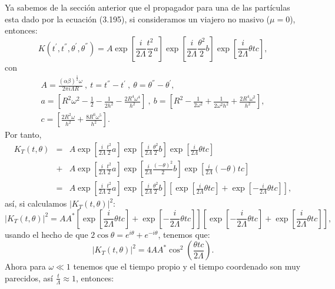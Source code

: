 Ya sabemos de la sección anterior que el propagador para una de las partículas esta dado por la ecuación (3.195), si consideramos un viajero no masivo ($\mu=0$), entonces:
\begin{equation}
K(t^{'},t^{''},\theta^{'},\theta^{''})=A\exp\left[\frac{i}{2\Lambda}\frac{t^{2}}{2}a\right]\exp\left[\frac{i}{2\Lambda}\frac{\theta^{2}}{2}b\right]\exp\left[\frac{i}{2\Lambda}\theta tc\right],
\end{equation}
con
\begin{eqnarray}
\nonumber &A=\frac{(\alpha\beta)^{\frac{1}{2}}\omega}{2\pi i\Lambda R}\ ,\ t=t^{''}-t^{'}\ ,\ \theta=\theta^{''}-\theta^{'},&\\
\nonumber & a=\left[R^{2}\omega^{2}-\frac{1}{2}-\frac{1}{2h^{2}}-\frac{2R^{4}\omega^{4}}{h^{2}}\right]\ ,\ b=\left[R^{2}-\frac{1}{2\omega^{2}}+\frac{1}{2\omega^{2}h^{2}}+\frac{2R^{4}\omega^{2}}{h^{2}}\right],&\\
&c=\left[\frac{2R^{2}\omega}{h^{2}}+\frac{8R^{6}\omega^{5}}{h^{2}}\right].&
\end{eqnarray}
Por tanto,
\begin{eqnarray}
\nonumber K_T(t,\theta)&=&A\exp\left[\frac{i}{2\Lambda}\frac{t^{2}}{2}a\right]\exp\left[\frac{i}{2\Lambda}\frac{\theta^{2}}{2}b\right]\exp\left[\frac{i}{2\Lambda}\theta tc\right]\\
\nonumber &+&A\exp\left[\frac{i}{2\Lambda}\frac{t^{2}}{2}a\right]\exp\left[\frac{i}{2\Lambda}\frac{(-\theta)^{2}}{2}b\right]\exp\left[\frac{i}{2\Lambda}(-\theta)tc\right]\\
&=&A\exp\left[\frac{i}{2\Lambda}\frac{t^{2}}{2}a\right]\exp\left[\frac{i}{2\Lambda}\frac{\theta^{2}}{2}b\right]\left[\exp\left[\frac{i}{2\Lambda}\theta tc\right]+\exp\left[-\frac{i}{2\Lambda}\theta tc\right]\right],
\end{eqnarray}
así, si calculamos $|K_T(t,\theta)|^2$:
\begin{equation}
|K_{T}(t,\theta)|^{2}=AA^{*}\left[\exp\left[\frac{i}{2\Lambda}\theta tc\right]+\exp\left[-\frac{i}{2\Lambda}\theta tc\right]\right]\left[\exp\left[-\frac{i}{2\Lambda}\theta tc\right]+\exp\left[\frac{i}{2\Lambda}\theta tc\right]\right],
\end{equation}
usando el hecho de que $2\cos\theta=e^{i\theta}+e^{-i\theta}$, tenemos que:
\begin{equation}
|K_{T}(t,\theta)|^{2}=4AA^{*}\cos^{2}\left(\frac{\theta tc}{2\Lambda}\right).
\end{equation}
Ahora para $\omega\ll 1$ tenemos que el tiempo propio y el tiempo coordenado son muy parecidos, así $\frac{t}{\Lambda}\approx 1$, entonces:

